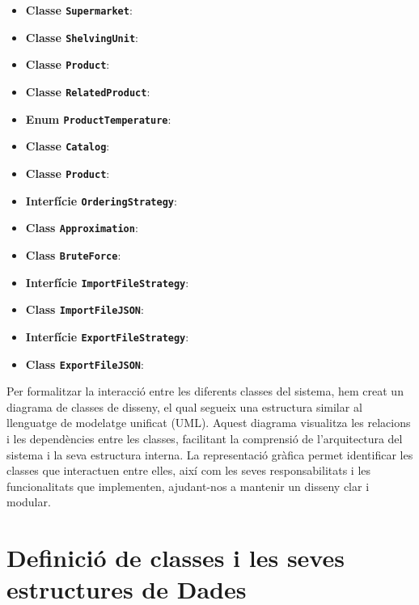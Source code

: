 \documentclass[a4paper,12pt]{report}
\begin{document}
	\begin{itemize}
		\item \textbf{Classe \texttt{Supermarket}}:
		\item \textbf{Classe \texttt{ShelvingUnit}}:
		\item \textbf{Classe \texttt{Product}}:
		\item \textbf{Classe \texttt{RelatedProduct}}:
		\item \textbf{Enum \texttt{ProductTemperature}}:
		\item \textbf{Classe \texttt{Catalog}}:
		\item \textbf{Classe \texttt{Product}}:
		\item \textbf{Interfície \texttt{OrderingStrategy}}:
		\item \textbf{Class \texttt{Approximation}}:
		\item \textbf{Class \texttt{BruteForce}}:
		\item \textbf{Interfície \texttt{ImportFileStrategy}}:
		\item \textbf{Class \texttt{ImportFileJSON}}:
		\item \textbf{Interfície \texttt{ExportFileStrategy}}:
		\item \textbf{Class \texttt{ExportFileJSON}}:
	\end{itemize}

	Per formalitzar la interacció entre les diferents classes del sistema, hem creat un diagrama de classes de disseny, el qual segueix una estructura similar al llenguatge de modelatge unificat (UML). Aquest diagrama visualitza les relacions i les dependències entre les classes, facilitant la comprensió de l'arquitectura del sistema i la seva estructura interna. La representació gràfica permet identificar les classes que interactuen entre elles, així com les seves responsabilitats i les funcionalitats que implementen, ajudant-nos a mantenir un disseny clar i modular.


	\chapter{Definició de classes i les seves estructures de Dades}
\end{document}
